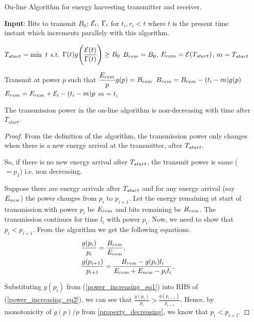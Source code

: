 \begin{algorithm}
\caption {On-line Algorithm for energy harvesting transmitter and receiver.}
\footnotesize
\label{algo_online}
\begin{algorithmic}[1]
\State \textbf{Input}: Bits to transmit $B_0$; $\mathcal{E}_i$, $\Gamma_i$ for $t_i,r_i<t$ where $t$ is the present time instant which increments parallely with this algorithm. 

\State $T_{\mbox{\scriptsize{start}}}=\min\ t$ s.t. $\Gamma(t)g\Bigg{(} \dfrac{\mathcal{E}(t)}{\Gamma(t)}\Bigg{)}\ge B_0$
\State $B_{\mbox{\scriptsize{rem}}}=B_0$, $E_{\mbox{\scriptsize{rem}}}=\ETx(T_{\mbox{\scriptsize{start}}})$, $m=T_{\mbox{\scriptsize{start}}}$

\Do
	\State Transmit at power $p$ such that $\dfrac{E_{\mbox{\scriptsize{rem}}}}{p} g(p)= B_{\mbox{\scriptsize{rem}}}$
		\State $B_{\mbox{\scriptsize{rem}}}=B_{\mbox{\scriptsize{rem}}}-(t_i-m)g(p)$
		\State $E_{\mbox{\scriptsize{rem}}}=E_{\mbox{\scriptsize{rem}}}+\ETx_i-(t_i-m)p$
		\State $m=t_i$
	\EndIf
{}
\end{algorithmic}
\end{algorithm}

\begin{lemma}
The transmission power in the on-line algorithm is non-decreasing with time after $T_{start}$.
\label{online_power}
\end{lemma}
\begin{proof}
From the definition of the algorithm, the transmission power only changes when there is a new energy arrival at the transmitter, after $T_{\mbox{\scriptsize{start}}}$. 

So, if there is no new energy arrival after $T_{\mbox{\scriptsize{start}}}$, the transmit power is same ($=p_1$) i.e. non decreasing. 

Suppose there are energy arrivals after $T_{\mbox{\scriptsize{start}}}$ and for any energy arrival (say $E_{\mbox{\scriptsize{new}}}$) the power changes from $p_i$ to $p_{i+1}$. Let the energy remaining at start of transmission with power $p_i$ be $E_{\mbox{\scriptsize{rem}}}$ and bits remaining be $B_{\mbox{\scriptsize{rem}}}$. The transmission continues for time $l_i$ with power $p_i$. Now, we need to show that $p_i<p_{i+1}$. From the algorithm we get the following equations.  
\begin{align}
&\frac{g(p_i)}{p_i}=\frac{B_{\mbox{\scriptsize{rem}}}}{E_{\mbox{\scriptsize{rem}}}} \label{power_increasing_eq1},
\\
&\frac{g(p_{i+1})}{p_{i+1}}=\frac{B_{\mbox{\scriptsize{rem}}}-g(p_i) l_i}{E_{\mbox{\scriptsize{rem}}}+E_{\mbox{\scriptsize{new}}}-p_i l_i}.\label{power_increasing_eq2}
\end{align}

Substituting $g(p_i)$ from (\ref{power_increasing_eq1}) into RHS of (\ref{power_increasing_eq2}), we can see that $\frac{g(p_i)}{p_i}>\frac{g(p_{i+1})}{p_{i+1}}$. Hence, by monotonicity of $g(p)/p$ from \eqref{property_decreasing}, we know that $p_i<p_{i+1}$.
\end{proof}

